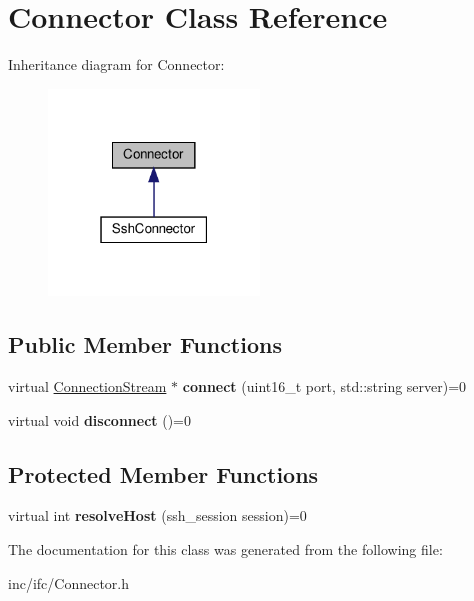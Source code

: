 \hypertarget{classConnector}{}\section{Connector Class Reference}
\label{classConnector}


Inheritance diagram for Connector\+:\nopagebreak
\begin{figure}[H]
\begin{center}
\leavevmode
\includegraphics[width=159pt]{classConnector__inherit__graph}
\end{center}
\end{figure}
\subsection*{Public Member Functions}
\begin{DoxyCompactItemize}
\item 
\mbox{\label{classConnector_a54e1432219a30649a9eb2bfd7e9ff89e}} 
virtual \hyperlink{classConnectionStream}{Connection\+Stream} $\ast$ {\bfseries connect} (uint16\+\_\+t port, std\+::string server)=0
\item 
\mbox{\label{classConnector_afec79f2f375e2e1bca502602aed6b129}} 
virtual void {\bfseries disconnect} ()=0
\end{DoxyCompactItemize}
\subsection*{Protected Member Functions}
\begin{DoxyCompactItemize}
\item 
\mbox{\label{classConnector_a4e63ecab513194724dc6a4e84068bcb5}} 
virtual int {\bfseries resolve\+Host} (ssh\+\_\+session session)=0
\end{DoxyCompactItemize}


The documentation for this class was generated from the following file\+:\begin{DoxyCompactItemize}
\item 
inc/ifc/Connector.\+h\end{DoxyCompactItemize}
